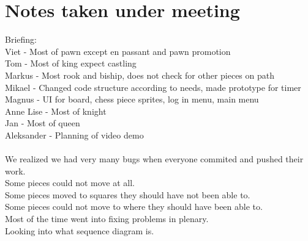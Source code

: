 \documentclass[letterpaper,11pt]{article}
\begin{document}
\section*{Notes taken under meeting}
Briefing: \\
Viet - Most of pawn except en passant and pawn promotion \\
Tom - Most of king expect castling \\
Markus - Most rook and biship, does not check for other pieces on path \\
Mikael - Changed code structure according to needs, made prototype for timer \\
Magnus - UI for board, chess piece sprites, log in menu, main menu \\
Anne Lise - Most of knight \\
Jan - Most of queen \\
Aleksander - Planning of video demo \\\\
We realized we had very many bugs when everyone commited and pushed their work. \\
Some pieces could not move at all. \\
Some pieces moved to squares they should have not been able to. \\
Some pieces could not move to where they should have been able to. \\
Most of the time went into fixing problems in plenary. \\
Looking into what sequence diagram is. \\
\end{document}
